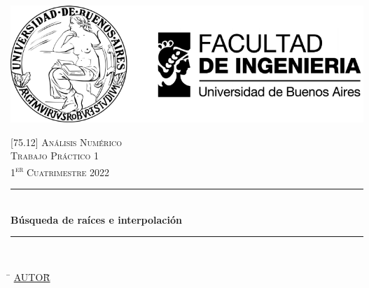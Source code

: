 
\fancyhf{}
\chead{}
\rfoot{}
\lfoot{}
\renewcommand{\thesubsection}{\thesection.\alph{subsection}}

\pagestyle{fancy}
\begin{titlepage}
	\newcommand{\HRule}{\rule{\linewidth}{0.5mm}} %
	\center %
	
	\thispagestyle{empty}
	\begin{center}
		\includegraphics[scale=0.9]{includes/banner_fiuba.pdf}\\
	\end{center}
	
	
	\textsc{\Large \textsc{[75.12] Análisis Numérico}}\\[0.3cm]
	\textsc{\Large \textsc{Trabajo Práctico 1}}\\[0.3cm]
	\textsc{\large 1\textsuperscript{er} Cuatrimestre 2022}\\[0.25cm]
	
	\HRule\\[0.2cm]
	{\large\bfseries Búsqueda de raíces e interpolación}\\[0.2cm]
	\HRule\\[0.2cm]
	
	\begin{tabbing}
		\hspace{2cm}\=\+
		\underline{AUTOR}\hspace{-1cm}\=\+\hspace{1cm}\=\hspace{6cm}\=\\[0.2cm]
		

\end{tabbing}
\end{titlepage}
